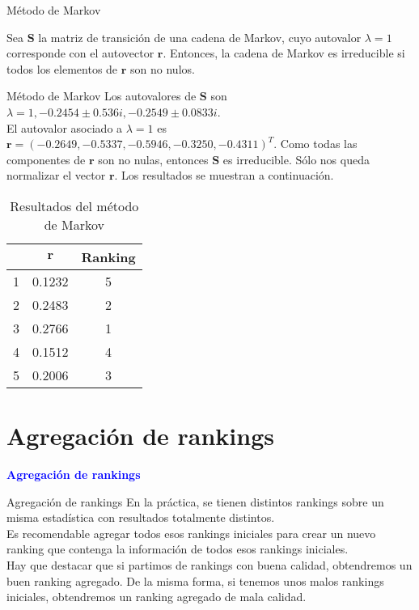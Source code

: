 \documentclass[10pt]{beamer}
\begin{document}
	\begin{frame}{Método de Markov}
	\begin{prop}
		Sea $\mathbf{S}$ la matriz de transición de una cadena de Markov, cuyo autovalor $\lambda = 1$ corresponde con el autovector $\mathbf{r}$. Entonces, la cadena de Markov es irreducible si todos los elementos de $\mathbf{r}$ son no nulos.
	\end{prop}
	\end{frame}
	
	\begin{frame}{Método de Markov}
		Los autovalores de $\mathbf{S}$ son $\lambda = 1, -0.2454 \pm 0.536i, -0.2549 \pm 0.0833i$.\\
		El autovalor asociado a $\lambda = 1$ es $\mathbf{r} = (-0.2649, -0.5337, -0.5946, -0.3250, -0.4311)^T$. Como todas las componentes de $\mathbf{r}$ son no nulas, entonces $\mathbf{S}$ es irreducible. Sólo nos queda normalizar el vector $\mathbf{r}$. Los resultados se muestran a continuación. 
		
		\begin{table}[h]
			\centering
			\caption{Resultados del método de Markov}
			\label{tbl:markov_resultados}
			\begin{tabular}{@{}ccc@{}}
				\cmidrule(l){2-3}
				& $\mathbf{r}$ & Ranking \\ \midrule
				1 & 0.1232       & 5       \\
				2 & 0.2483       & 2       \\
				3 & 0.2766       & 1       \\
				4 & 0.1512       & 4       \\
				5 & 0.2006       & 3       \\ \bottomrule
			\end{tabular}
		\end{table}
		
	\end{frame}
	
	\section{Agregación de rankings}
	
	\begin{frame}
		\begin{center}
			\Huge\textbf{\textsf{\textcolor{blue}{Agregación de rankings}}}
		\end{center}
	\end{frame}
	
	\begin{frame}{Agregación de rankings}
		En la práctica, se tienen distintos rankings sobre un misma estadística con resultados totalmente distintos.\\
		
		Es recomendable agregar todos esos rankings iniciales para crear un nuevo ranking que contenga la información de todos esos rankings iniciales.\\
		
		Hay que destacar que si partimos de rankings con buena calidad, obtendremos un buen ranking agregado. De la misma forma, si tenemos unos malos rankings iniciales, obtendremos un ranking agregado de mala calidad.
	\end{frame}
	
\end{document}
